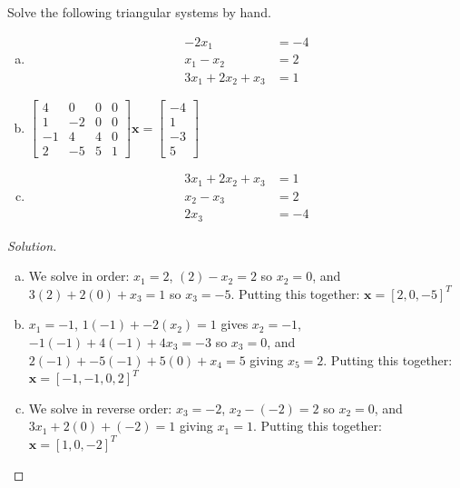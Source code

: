 \documentclass{article}
\renewcommand{\vec}[1]{\mathbf{#1}}
\newenvironment{problem}[2][Problem]{\begin{trivlist}
\item[\hskip \labelsep {\bfseries #1}\hskip \labelsep {\bfseries #2.}]}{\end{trivlist}}
\theoremstyle{definition}
\begin{document}
\begin{problem}{2.3.2}
    Solve the following triangular systems by hand.
    \begin{enumerate}[(a)]
        \item
        \begin{align*}
            -2x_1 &= -4 \\
            x_1 - x_2 &= 2 \\
            3x_1 + 2x_2 + x_3 &= 1
        \end{align*}
        \item $\begin{bmatrix*}4 & 0 & 0 & 0\\1 & -2 & 0 & 0\\-1 & 4 & 4 & 0\\2 & -5 & 5 & 1\end{bmatrix*}\vec{x} = \begin{bmatrix*}-4 \\ 1 \\-3 \\5\end{bmatrix*}$
        \item \begin{align*}
            3x_1 + 2x_2 + x_3 &= 1\\
            x_2 - x_3 &= 2\\
            2x_3 &= -4
        \end{align*}
    \end{enumerate}
\end{problem}
\begin{proof}[Solution]
    \begin{enumerate}[(a)]
        \item We solve in order: $x_1 = 2$, $(2) - x_2 = 2$ so $x_2 = 0$, and $3(2) + 2(0) + x_3 = 1$ so $x_3 = -5$. Putting this together: $\vec{x} = [2, 0, -5]^T$
        \item $x_1 = -1$, $1(-1) + -2(x_2) = 1$ gives $x_2 = -1$, $-1(-1) + 4(-1) + 4x_3 = -3$ so $x_3 = 0$, and $2(-1) + -5(-1) + 5(0) + x_4 = 5$ giving $x_5 = 2$. Putting this together: $\vec{x} = [-1, -1, 0, 2]^T$
        \item We solve in reverse order: $x_3 = -2$, $x_2 - (-2) = 2$ so $x_2 = 0$, and $3x_1 + 2(0) + (-2) = 1$ giving $x_1 = 1$. Putting this together: $\vec{x} = [1, 0, -2]^T$
    \end{enumerate}
\end{proof}
\end{document}
